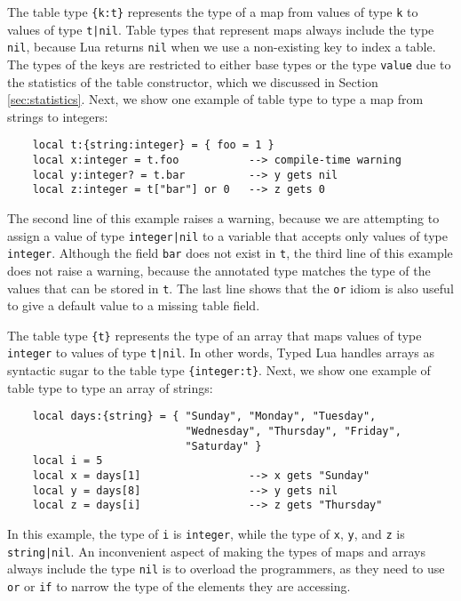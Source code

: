 The table type \texttt{\{k:t\}} represents the type of a map
from values of type \texttt{k} to values of type \texttt{t|nil}.
Table types that represent maps always include the type \texttt{nil},
because Lua returns \texttt{nil} when we use a non-existing key to
index a table. 
The types of the keys are restricted to either base types or the
type \texttt{value} due to the statistics of the table constructor,
which we discussed in Section \ref{sec:statistics}.
Next, we show one example of table type to type a map from strings to integers:
\begin{verbatim}
    local t:{string:integer} = { foo = 1 } 
    local x:integer = t.foo           --> compile-time warning
    local y:integer? = t.bar          --> y gets nil
    local z:integer = t["bar"] or 0   --> z gets 0 
\end{verbatim}

The second line of this example raises a warning, because we are
attempting to assign a value of type \texttt{integer|nil} to a
variable that accepts only values of type \texttt{integer}.
Although the field \texttt{bar} does not exist in \texttt{t}, the third
line of this example does not raise a warning, because the
annotated type matches the type of the values that can be stored in
\texttt{t}.
The last line shows that the \texttt{or} idiom is also useful to
give a default value to a missing table field.

The table type \texttt{\{t\}} represents the type of an array that 
maps values of type \texttt{integer} to values of type \texttt{t|nil}.
In other words, Typed Lua handles arrays as syntactic sugar to the
table type \texttt{\{integer:t\}}.
Next, we show one example of table type to type an array of strings:
\begin{verbatim}
    local days:{string} = { "Sunday", "Monday", "Tuesday",
                            "Wednesday", "Thursday", "Friday",
                            "Saturday" }
    local i = 5
    local x = days[1]                 --> x gets "Sunday"
    local y = days[8]                 --> y gets nil
    local z = days[i]                 --> z gets "Thursday"
\end{verbatim}

In this example, the type of \texttt{i} is \texttt{integer},
while the type of \texttt{x}, \texttt{y}, and \texttt{z} is
\texttt{string|nil}.
An inconvenient aspect of making the types of maps and arrays always
include the type \texttt{nil} is to overload the programmers,
as they need to use \texttt{or} or \texttt{if} to narrow the type of
the elements they are accessing.

